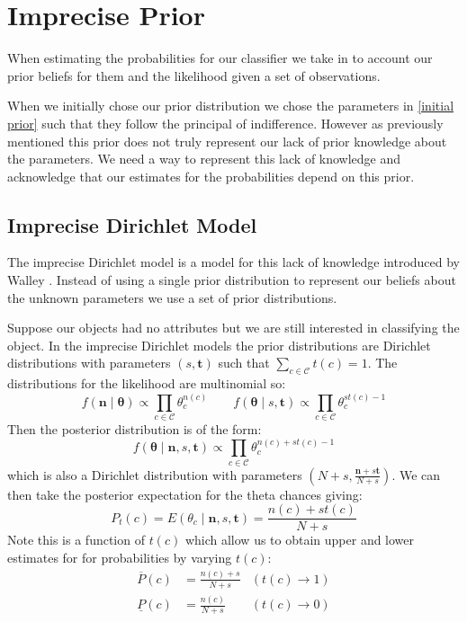 \newcommand{\sn}[2]{\ensuremath{{#1}\times 10^{#2}}}

\chapter{Imprecise Prior}

When estimating the probabilities for our classifier we take in to account our prior beliefs for them and the likelihood given a set of observations.

When we initially chose our prior distribution we chose the parameters in \cref{initial prior} such that they follow the principal of indifference.
However as previously mentioned this prior does not truly represent our lack of prior knowledge about the parameters.
We need a way to represent this lack of knowledge and acknowledge that our estimates for the probabilities depend on this prior.

\section{Imprecise Dirichlet Model}

The imprecise Dirichlet model is a model for this lack of knowledge introduced by Walley \cite{Walley96}.
Instead of using a single prior distribution to represent our beliefs about the unknown parameters we use a set of prior distributions.

Suppose our objects had no attributes but we are still interested in classifying the object.
In the imprecise Dirichlet models the prior distributions are Dirichlet distributions with parameters $(s, \mathbf{t})$ such that $\sum_{c \in \mathcal{C}} t(c) = 1$.
The distributions for the likelihood are multinomial so:
\begin{equation}
	f(\mathbf{n} \mid \mathbf{\theta}) \propto \prod_{c \in \mathcal{C}} \theta_c^{n(c)}
	\qquad
	f(\mathbf{\theta} \mid s, \mathbf{t}) \propto \prod_{c \in \mathcal{C}} \theta_c^{st(c) - 1}
\end{equation}
Then the posterior distribution is of the form:
\begin{equation} \label{dirichlet_pdf}
	f(\mathbf{\theta} \mid \mathbf{n}, s, \mathbf{t}) \propto \prod_{c \in \mathcal{C}} \theta_c^{n(c) + st(c) - 1}
\end{equation}
which is also a Dirichlet distribution with parameters $(N+s, \frac{\mathbf{n}+s\mathbf{t}}{N+s})$.
We can then take the posterior expectation for the theta chances giving:
\begin{equation}
	P_t(c) = E(\theta_c \mid \mathbf{n}, s, \mathbf{t}) = \frac{n(c)+st(c)}{N+s}
\end{equation}
Note this is a function of $t(c)$ which allow us to obtain upper and lower estimates for for probabilities by varying $t(c)$:
\begin{align}
	\overline{P}(c) & = \frac{n(c)+s}{N+s} & (t(c) \rightarrow 1) \\
	\underline{P}(c) & = \frac{n(c)}{N+s}  & (t(c) \rightarrow 0)
\end{align}

